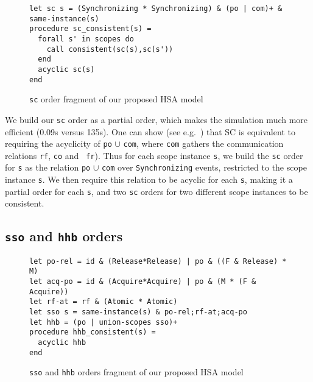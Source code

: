 \documentclass[a4paper]{article}
\begin{document}
\begin{figure}[!h]
\begin{verbatim}
let sc s = (Synchronizing * Synchronizing) & (po | com)+ & same-instance(s)
procedure sc_consistent(s) =
  forall s' in scopes do 
    call consistent(sc(s),sc(s'))
  end
  acyclic sc(s)
end
\end{verbatim}
\vspace*{-4mm}
\caption{{\tt sc} order fragment of our proposed HSA model}
\end{figure}

We build our {\tt sc} order as a partial order, which makes the simulation much
more efficient (0.09s versus 135s). One can show (see e.g.~\cite{alg10}) that
SC is equivalent to requiring the acyclicity of {\tt po} $\cup$ {\tt com},
where {\tt com} gathers the communication relations {\tt rf}, {\tt co} and {\tt
fr}). Thus for each scope instance {\tt s}, we build the {\tt sc} order for
{\tt s} as the relation {\tt po} $\cup$ {\tt com} over {\tt Synchronizing}
events, restricted to the scope instance {\tt s}. We then require this relation
to be acyclic for each {\tt s}, making it a partial order for each {\tt s}, and
two {\tt sc} orders for two different scope instances to be consistent.

\subsection{{\tt sso} and {\tt hhb} orders \label{sec:sso-proposed}}

\begin{figure}[!h]
\begin{verbatim}
let po-rel = id & (Release*Release) | po & ((F & Release) * M)
let acq-po = id & (Acquire*Acquire) | po & (M * (F & Acquire))
let rf-at = rf & (Atomic * Atomic)
let sso s = same-instance(s) & po-rel;rf-at;acq-po
let hhb = (po | union-scopes sso)+
procedure hhb_consistent(s) =
  acyclic hhb
end
\end{verbatim}
\vspace*{-4mm}
\caption{{\tt sso} and {\tt hhb} orders fragment of our proposed HSA model}
\end{figure}
\end{document}
